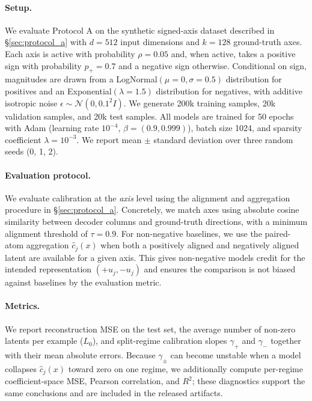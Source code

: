 \documentclass{article}
\begin{document}
\paragraph{Setup.}
We evaluate Protocol A on the synthetic signed-axis dataset described in \S\ref{sec:protocol_a} with
$d=512$ input dimensions and $k=128$ ground-truth axes. Each axis is active with probability $\rho=0.05$ and, when active,
takes a positive sign with probability $p_+=0.7$ and a negative sign otherwise. Conditional on sign, magnitudes are drawn from
a LogNormal$(\mu=0,\sigma=0.5)$ distribution for positives and an Exponential$(\lambda=1.5)$ distribution for negatives, with
additive isotropic noise $\epsilon \sim \mathcal{N}(0, 0.1^2 I)$.
We generate 200k training samples, 20k validation samples, and 20k test samples. All models are trained for 50 epochs with
Adam (learning rate $10^{-4}$, $\beta=(0.9,0.999)$), batch size 1024, and sparsity coefficient $\lambda=10^{-3}$.
We report mean $\pm$ standard deviation over three random seeds (0, 1, 2).

\paragraph{Evaluation protocol.}
We evaluate calibration at the \emph{axis} level using the alignment and aggregation procedure in \S\ref{sec:protocol_a}.
Concretely, we match axes using absolute cosine similarity between decoder columns and ground-truth directions, with a minimum
alignment threshold of $\tau=0.9$. For non-negative baselines, we use the paired-atom aggregation $\hat{c}_j(x)$ when both a
positively aligned and negatively aligned latent are available for a given axis. This gives non-negative models credit for the
intended representation $(+u_j,-u_j)$ and ensures the comparison is not biased against baselines by the evaluation metric.

\paragraph{Metrics.}
We report reconstruction MSE on the test set, the average number of non-zero latents per example ($L_0$), and split-regime
calibration slopes $\gamma_+$ and $\gamma_-$ together with their mean absolute errors. Because $\gamma_\pm$ can become unstable
when a model collapses $\hat{c}_j(x)$ toward zero on one regime, we additionally compute per-regime coefficient-space MSE,
Pearson correlation, and $R^2$; these diagnostics support the same conclusions and are included in the released artifacts.
\end{document}
